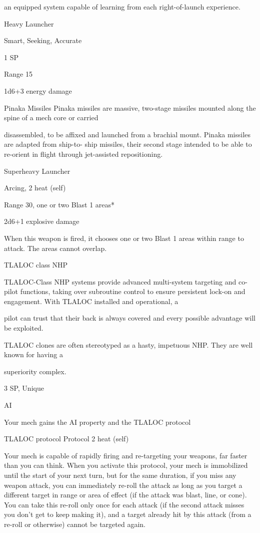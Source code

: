 an equipped system capable of learning from each right-of-launch experience.

Heavy Launcher

Smart, Seeking, Accurate

1 SP

Range 15

1d6+3 energy damage


Pinaka Missiles
Pinaka missiles are massive, two-stage missiles mounted along the spine of a mech core or carried

disassembled, to be affixed and launched from a brachial mount.  Pinaka missiles are adapted from ship-to-
ship missiles, their second stage intended to be able to re-orient in flight through jet-assisted repositioning.

Superheavy Launcher

Arcing, 2 heat (self)





Range 30, one or two Blast 1 areas*

2d6+1 explosive damage

When this weapon is fired, it chooses one or two Blast 1 areas within range to attack. The areas
cannot overlap.


TLALOC class NHP

TLALOC-Class NHP systems provide advanced multi-system targeting and co-pilot functions, taking over
subroutine control to ensure persistent lock-on and engagement. With TLALOC installed and operational, a

pilot can trust that their back is always covered and every possible advantage will be exploited.

TLALOC clones are often stereotyped as a hasty, impetuous NHP. They are well known for having a

superiority complex.

3 SP, Unique


AI

Your mech gains the AI property and the TLALOC protocol


TLALOC protocol
Protocol
2 heat (self)

Your mech is capable of rapidly firing and re-targeting your weapons, far faster than you can
think. When you activate this protocol, your mech is immobilized until the start of your next turn,
but for the same duration, if you miss any weapon attack, you can immediately re-roll the attack
as long as you target a different target in range or area of effect (if the attack was blast, line, or
cone). You can take this re-roll only once for each attack (if the second attack misses you don’t
get to keep making it), and a target already hit by this attack (from a re-roll or otherwise) cannot
be targeted again.



